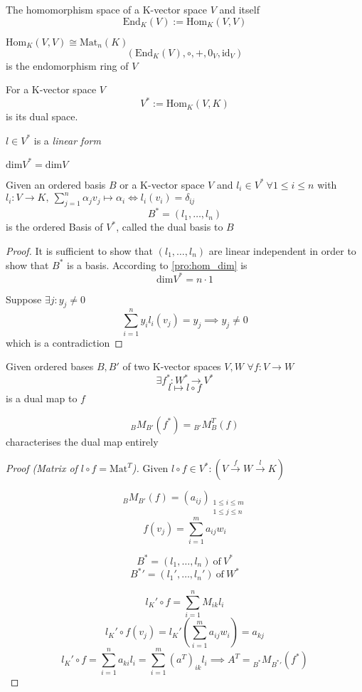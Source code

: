 \begin{definition}
   The homomorphism space of a K-vector space \(V\) and itself
   \[\text{End}_K(V) := \text{Hom}_K(V, V)\]
\end{definition}
\begin{remark}
   \(\text{Hom}_K(V, V) \cong \text{Mat}_n(K)\)
   \[(\text{End}_K(V), \circ, +, 0_V, \text{id}_V)\]
   is the endomorphism ring of \(V\)
\end{remark}

\begin{definition}
   For a K-vector space \(V\)
   \[V^* := \text{Hom}_K(V, K)\]
   is its dual space.

   \(l \in V^*\) is a \textit{linear form}
\end{definition}
\begin{remark}
   \(\text{dim}V^* = \text{dim}V\)
\end{remark}

\begin{proposition}
   Given an ordered basis \(B\) or a K-vector space \(V\) and \(l_i \in V^*~\forall 1 \leq i \leq n\) with \(l_i: V \to K,~\sum_{j=1}^n \alpha_j v_j \mapsto \alpha_i \iff l_i(v_i) = \delta_{íj}\)
   \[B^* = (l_1, \ldots, l_n)\]
   is the ordered Basis of \(V^*\), called the dual basis to \(B\)
\end{proposition}
\begin{proof}
   It is sufficient to show that \((l_1, \ldots, l_n)\) are linear independent in order to show that \(B^*\) is a basis.
   According to \cref{pro:hom_dim} is
   \[\text{dim}V^* = n \cdot 1\]

   Suppose \(\exists j: y_j \neq 0\)
   \[\sum_{i=1}^n y_i l_i(v_j) = y_j \implies y_j \neq 0\]
   which is a contradiction
\end{proof}

\begin{proposition}
   Given ordered bases \(B, B'\) of two K-vector spaces \(V, W\)
   \(\forall f: V \to W\)
   \[\exists f^*: W^* \to V^*\]
   \[l \mapsto l \circ f\]
   is a dual map to \(f\)

   \[{}_{B}M_{B'}(f^*) = {}_{B'}M_{B}^T(f)\]
   characterises the dual map entirely
\end{proposition}
\begin{proof}[Proof (Matrix of \(l \circ f = \text{Mat}^T\))]
   Given \(l \circ f \in V^*: (V \xrightarrow{f} W \xrightarrow{l} K)\)

   \[{}_{B}M_{B'}(f) = (a_{ij})_{\substack{1 \leq i \leq m \\ 1 \leq j \leq n}}\]
   \[f(v_j) = \sum_{i=1}^m a_{ij} w_i\]

   \[B^* = (l_1, \ldots, l_n)~\text{of}~V^*\]
   \[B^*' = (l_1', \ldots, l_n')~\text{of}~W^*\]

   \[l_K' \circ f = \sum_{i=1}^n M_{ik} l_i\]
   \[l_K' \circ f(v_j) = l_K'\left(\sum_{i=1}^m a_{ij} w_i \right) = a_{kj}\]
   \[l_K' \circ f = \sum_{i=1}^n a_{ki} l_i = \sum_{i=1}^m (a^T)_{ik} l_i \implies A^T = {}_{B^*}M_{B^*'}(f^*)\]
\end{proof}

